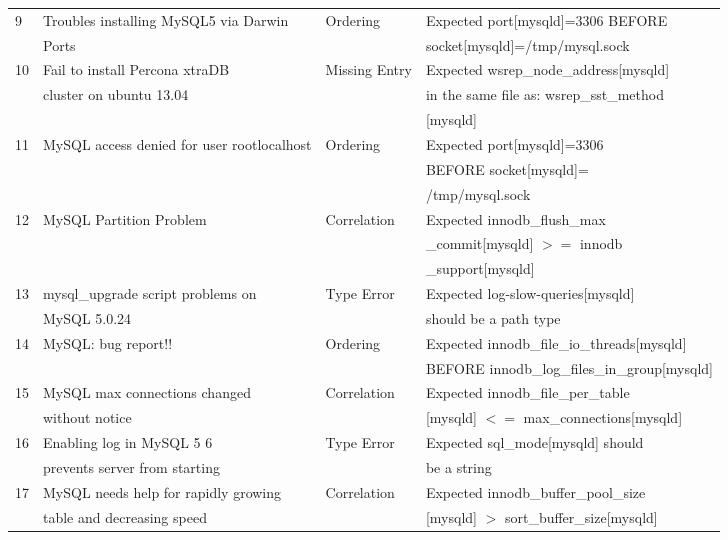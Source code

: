 \begin{table*}[tbp]
\begin{footnotesize}
\begin{tabular}{|l|l|l|l|}
9 & Troubles installing MySQL5 via  Darwin 
& Ordering
& Expected port[mysqld]=3306 BEFORE \\ & Ports
&&  socket[mysqld]=/tmp/mysql.sock \\ \hline

10 & Fail to install Percona xtraDB 
& Missing Entry
& Expected wsrep\_node\_address[mysqld] \\ & cluster on ubuntu 13.04
&&  in the same file as: wsrep\_sst\_method \\ &&& [mysqld] \\ \hline

11 & MySQL access denied for user rootlocalhost 
& Ordering
& Expected port[mysqld]=3306  \\ & &&   BEFORE socket[mysqld]= \\ &&& /tmp/mysql.sock
\\ \hline

12 & MySQL Partition Problem
& Correlation
& Expected innodb\_flush\_max  \\ & &&  \_commit[mysqld] $>=$ innodb \\ &&&  \_support[mysqld] \\ \hline

13 & mysql\_upgrade script problems on 
& Type Error
& Expected log-slow-queries[mysqld]  \\ & MySQL 5.0.24 
&&  should be a path type\\ \hline


14 & MySQL: bug report!!
& Ordering
& Expected innodb\_file\_io\_threads[mysqld]  \\ & 
&& BEFORE innodb\_log\_files\_in\_group[mysqld]\\ \hline

15 & MySQL max connections changed 
& Correlation
& Expected innodb\_file\_per\_table \\ & without notice
&&  [mysqld] $<=$ max\_connections[mysqld]  \\ \hline

16 & Enabling log in MySQL 5 6 
& Type Error
& Expected sql\_mode[mysqld] should  \\ & prevents server from starting
&&  be a string \\ \hline

17 & MySQL needs help for rapidly growing 
& Correlation
& Expected innodb\_buffer\_pool\_size \\ & table and decreasing speed
&&  [mysqld] $>$ sort\_buffer\_size[mysqld] \\ \hline


\end{tabular}
\end{footnotesize}
\end{table*}
